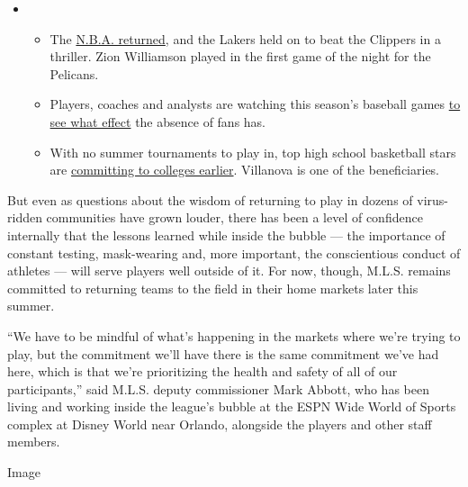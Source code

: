 \begin{itemize}
\item
  \begin{itemize}
  \tightlist
  \item
    The
    \href{https://www.nytimes3xbfgragh.onion/2020/07/30/sports/basketball/clippers-lakers.html?action=click\&pgtype=Article\&state=default\&region=MAIN_CONTENT_2\&context=storylines_keepup}{N.B.A.
    returned}, and the Lakers held on to beat the Clippers in a
    thriller. Zion Williamson played in the first game of the night for
    the Pelicans.
  \item
    Players, coaches and analysts are watching this season's baseball
    games
    \href{https://www.nytimes3xbfgragh.onion/2020/07/31/sports/baseball/baseball-empty-stadiums-effects.html?action=click\&pgtype=Article\&state=default\&region=MAIN_CONTENT_2\&context=storylines_keepup}{to
    see what effect} the absence of fans has.
  \item
    With no summer tournaments to play in, top high school basketball
    stars are
    \href{https://www.nytimes3xbfgragh.onion/2020/07/30/sports/ncaabasketball/college-basketball-recruiting.html?action=click\&pgtype=Article\&state=default\&region=MAIN_CONTENT_2\&context=storylines_keepup}{committing
    to colleges earlier}. Villanova is one of the beneficiaries.
  \end{itemize}
\end{itemize}

But even as questions about the wisdom of returning to play in dozens of
virus-ridden communities have grown louder, there has been a level of
confidence internally that the lessons learned while inside the bubble
--- the importance of constant testing, mask-wearing and, more
important, the conscientious conduct of athletes --- will serve players
well outside of it. For now, though, M.L.S. remains committed to
returning teams to the field in their home markets later this summer.

``We have to be mindful of what's happening in the markets where we're
trying to play, but the commitment we'll have there is the same
commitment we've had here, which is that we're prioritizing the health
and safety of all of our participants,'' said M.L.S. deputy commissioner
Mark Abbott, who has been living and working inside the league's bubble
at the ESPN Wide World of Sports complex at Disney World near Orlando,
alongside the players and other staff members.

Image

